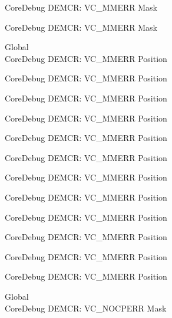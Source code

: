 \begin{DoxyRefList}
\label{deprecated__deprecated001197}%
%
Core\+Debug DEMCR\+: VC\+\_\+\+MMERR Mask 

\label{deprecated__deprecated001299}%
%
Core\+Debug DEMCR\+: VC\+\_\+\+MMERR Mask  
\item[Global \doxylink{group___c_m_s_i_s___core_debug_ga444454f7c7748e76cd76c3809c887c41}{Core\+Debug\+\_\+\+DEMCR\+\_\+\+VC\+\_\+\+MMERR\+\_\+\+Pos} ]\hfill \\
\label{deprecated__deprecated000067}%
%
Core\+Debug DEMCR\+: VC\+\_\+\+MMERR Position 

\label{deprecated__deprecated000211}%
%
Core\+Debug DEMCR\+: VC\+\_\+\+MMERR Position 

\label{deprecated__deprecated000353}%
%
Core\+Debug DEMCR\+: VC\+\_\+\+MMERR Position 

\label{deprecated__deprecated000429}%
%
Core\+Debug DEMCR\+: VC\+\_\+\+MMERR Position 

\label{deprecated__deprecated000518}%
%
Core\+Debug DEMCR\+: VC\+\_\+\+MMERR Position 

\label{deprecated__deprecated000620}%
%
Core\+Debug DEMCR\+: VC\+\_\+\+MMERR Position 

\label{deprecated__deprecated000745}%
%
Core\+Debug DEMCR\+: VC\+\_\+\+MMERR Position 

\label{deprecated__deprecated000889}%
%
Core\+Debug DEMCR\+: VC\+\_\+\+MMERR Position 

\label{deprecated__deprecated001031}%
%
Core\+Debug DEMCR\+: VC\+\_\+\+MMERR Position 

\label{deprecated__deprecated001107}%
%
Core\+Debug DEMCR\+: VC\+\_\+\+MMERR Position 

\label{deprecated__deprecated001196}%
%
Core\+Debug DEMCR\+: VC\+\_\+\+MMERR Position 

\label{deprecated__deprecated001298}%
%
Core\+Debug DEMCR\+: VC\+\_\+\+MMERR Position  
\item[Global \doxylink{group___c_m_s_i_s___core_debug_ga03ee58b1b02fdbf21612809034562f1c}{Core\+Debug\+\_\+\+DEMCR\+\_\+\+VC\+\_\+\+NOCPERR\+\_\+\+Msk} ]\hfill \\
\label{deprecated__deprecated000066}%
%
Core\+Debug DEMCR\+: VC\+\_\+\+NOCPERR Mask 


\end{DoxyRefList}
